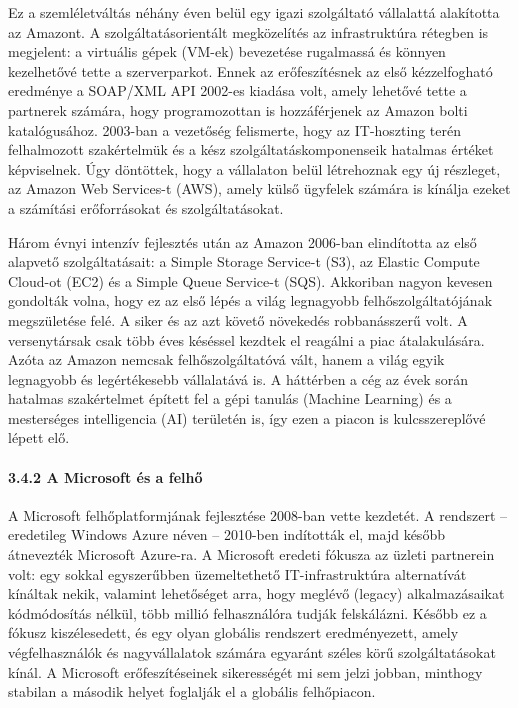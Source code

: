 \documentclass[
]{article}
\begin{document}
Ez a szemléletváltás néhány éven belül egy igazi szolgáltató vállalattá
alakította az Amazont. A szolgáltatásorientált megközelítés az
infrastruktúra rétegben is megjelent: a virtuális gépek (VM-ek)
bevezetése rugalmassá és könnyen kezelhetővé tette a szerverparkot.
Ennek az erőfeszítésnek az első kézzelfogható eredménye a SOAP/XML API
2002-es kiadása volt, amely lehetővé tette a partnerek számára, hogy
programozottan is hozzáférjenek az Amazon bolti katalógusához. 2003-ban
a vezetőség felismerte, hogy az IT-hoszting terén felhalmozott
szakértelmük és a kész szolgáltatáskomponenseik hatalmas értéket
képviselnek. Úgy döntöttek, hogy a vállalaton belül létrehoznak egy új
részleget, az Amazon Web Services-t (AWS), amely külső ügyfelek számára
is kínálja ezeket a számítási erőforrásokat és szolgáltatásokat.

Három évnyi intenzív fejlesztés után az Amazon 2006-ban elindította az
első alapvető szolgáltatásait: a Simple Storage Service-t (S3), az
Elastic Compute Cloud-ot (EC2) és a Simple Queue Service-t (SQS).
Akkoriban nagyon kevesen gondolták volna, hogy ez az első lépés a világ
legnagyobb felhőszolgáltatójának megszületése felé. A siker és az azt
követő növekedés robbanásszerű volt. A versenytársak csak több éves
késéssel kezdtek el reagálni a piac átalakulására. Azóta az Amazon
nemcsak felhőszolgáltatóvá vált, hanem a világ egyik legnagyobb és
legértékesebb vállalatává is. A háttérben a cég az évek során hatalmas
szakértelmet épített fel a gépi tanulás (Machine Learning) és a
mesterséges intelligencia (AI) területén is, így ezen a piacon is
kulcsszereplővé lépett elő.

\hypertarget{a-microsoft-uxe9s-a-felhux151}{%
\paragraph{3.4.2 A Microsoft és a
felhő}\label{a-microsoft-uxe9s-a-felhux151}}

A Microsoft felhőplatformjának fejlesztése 2008-ban vette kezdetét. A
rendszert -- eredetileg Windows Azure néven -- 2010-ben indították el,
majd később átnevezték Microsoft Azure-ra. A Microsoft eredeti fókusza
az üzleti partnerein volt: egy sokkal egyszerűbben üzemeltethető
IT-infrastruktúra alternatívát kínáltak nekik, valamint lehetőséget
arra, hogy meglévő (legacy) alkalmazásaikat kódmódosítás nélkül, több
millió felhasználóra tudják felskálázni. Később ez a fókusz
kiszélesedett, és egy olyan globális rendszert eredményezett, amely
végfelhasználók és nagyvállalatok számára egyaránt széles körű
szolgáltatásokat kínál. A Microsoft erőfeszítéseinek sikerességét mi sem
jelzi jobban, minthogy stabilan a második helyet foglalják el a globális
felhőpiacon.
\end{document}
